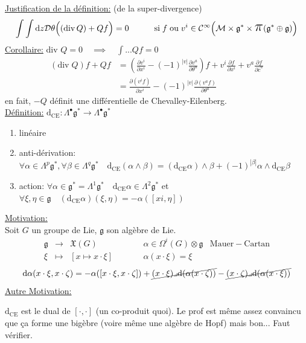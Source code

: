 \documentclass[a4paper,11pt]{article}
\renewcommand{\d}{{\mathrm{d}}}
\newcommand{\D}{{\mathcal{D}}}
\newcommand{\dr}[2]{\frac{\partial {#1}}{\partial{#2}}}
\newcommand{\ppi}{{\mathlarger{\mathlarger{\mathlarger{\pi}}}}}
\begin{document}
\noindent\underline{Justification de la définition:} (de la super-divergence)
$$\int\int \d z\D\theta \Big((\mathrm{div}\,Q) +Qf\Big)=0\quad \quad \quad \mathrm{si}\; f\;\mathrm{ou}\; v^i \in \mathcal{C}^\infty\Big(\mathcal M\times\mathfrak g^*\times\ppi(\mathfrak g^*\oplus\mathfrak g)\Big)$$
\underline{Corollaire:} \quad \quad div $Q=0 \quad\implies \quad \int ... Qf = 0$
\begin{align*}
(\mathrm{div}\;Q)f + Qf &= \left(\dr{v^i}{x^i}-(-1)^{|v|}\dr{v^a}{\theta^a}\right) f + v^i\dr f{x^i} + v^a\dr f {\bar c^a}\\
&=\dr{(v^if)}{x^i} - (-1)^{|v|}\dr{(v^af)}{\theta^a}
\end{align*}
en fait, $-Q$ définit une différentielle de Chevalley-Eilenberg.\\

\noindent\underline{Définition:} \quad $\d_\mathrm{CE}: \Lambda^\bullet\mathfrak g^* \longrightarrow \Lambda^\bullet\mathfrak{g}^*$
\begin{enumerate}
\item linéaire
\item anti-dérivation: $\forall\alpha\in\Lambda^p\mathfrak{g}^*,\forall\beta\in\Lambda^q\mathfrak{g}^*\quad\d_\mathrm{CE}(\alpha\wedge\beta) = (\d_\mathrm{CE}\alpha)\wedge\beta + (-1)^{|\beta|}\alpha\wedge\d_\mathrm{CE}\beta$
\item action: $\forall\alpha\in\mathfrak{g}^*=\Lambda^1\mathfrak{g}^* \quad \d_\mathrm{CE}\alpha\in\Lambda^2\mathfrak{g}^*$ et $\forall\xi,\eta\in\mathfrak{g}\quad (\d_\mathrm{CE}\alpha)(\xi,\eta) = - \alpha([xi,\eta])$
\end{enumerate}

\noindent\underline{Motivation:}\\
Soit $G$ un groupe de Lie, $\mathfrak{g}$ son algèbre de Lie.
$$\begin{matrix}
\mathfrak{g} & \to & \mathfrak{X}(G)&
\quad \quad&
\alpha\in\Omega^i(G)\otimes\mathfrak{g} &\mathrm{Mauer}-\mathrm{Cartan}\\
\xi & \mapsto & [x\mapsto x\cdot\xi]&&
\alpha(x\cdot\xi)=\xi
\end{matrix}$$
$$
\d \alpha (x\cdot\xi,x\cdot\zeta) = 
-\alpha([x\cdot\xi,x\cdot\zeta]) +
\cancel{(x\cdot\xi)\lrcorner\d(\alpha(x\cdot\zeta))} -
\cancel{(x\cdot\zeta)\lrcorner\d(\alpha(x\cdot\xi))}
$$
\underline{Autre Motivation:}

$\d_\mathrm{CE}$ est le dual de $[\cdot,\cdot]$ (un co-produit quoi). Le prof est même assez convaincu que ça forme une bigèbre (voire même une algèbre de Hopf) mais bon... Faut vérifier.
\end{document}
